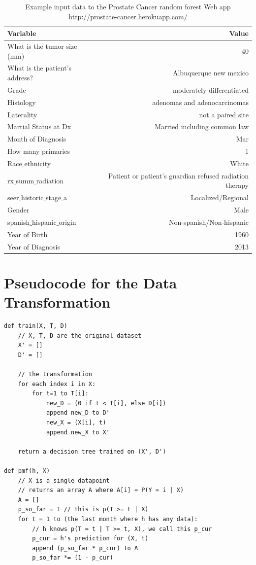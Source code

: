 \documentclass[a4paper,11pt]{article}
\begin{document}
\begin{table}[tbp]
\begin{center}
\begin{tabular}{lr}
  \toprule
  Variable  & Value \\ 
\midrule
  What is the tumor size (mm) & 40 \\  
  What is the patient's address? & Albuquerque new mexico \\ 
  Grade & moderately differentiated \\  
  Histology & adenomas and adenocarcinomas \\ 
  Laterality & not a paired site \\  
 Martial Status at Dx & Married including common law \\  
 Month of Diagnosis & Mar \\  
 How many primaries & 1 \\  
  Race$\_$ethnicity & White \\  
 rx$\_$summ$\_$radiation & Patient or patient's guardian refused radiation therapy \\
  seer$\_$historic$\_$stage$\_$a  & Localized/Regional \\ 
  Gender & Male \\  
  spanish$\_$hispanic$\_$origin & Non-spanish/Non-hispanic \\ 
 Year of Birth & 1960 \\  
  Year of Diagnosis & 2013 \\
\bottomrule
\end{tabular}
\caption{Example input data to the Prostate Cancer random forest Web app \url{http://prostate-cancer.herokuapp.com/}}
\label{tab:abq}
\end{center}
\end{table}


\appendix
\section{Pseudocode for the Data Transformation}
\label{subsec:pseudocode}

\begin{verbatim}
def train(X, T, D)
    // X, T, D are the original dataset
    X' = []
    D' = []

    // the transformation
    for each index i in X:
        for t=1 to T[i]:
            new_D = (0 if t < T[i], else D[i])
            append new_D to D'
            new_X = (X[i], t)
            append new_X to X'

    return a decision tree trained on (X', D')

def pmf(h, X)
    // X is a single datapoint
    // returns an array A where A[i] = P(Y = i | X)
    A = []
    p_so_far = 1 // this is p(T >= t | X)
    for t = 1 to (the last month where h has any data):
        // h knows p(T = t | T >= t, X), we call this p_cur
        p_cur = h's prediction for (X, t)
        append (p_so_far * p_cur) to A
        p_so_far *= (1 - p_cur)

\end{verbatim}


%

%

\end{document}
